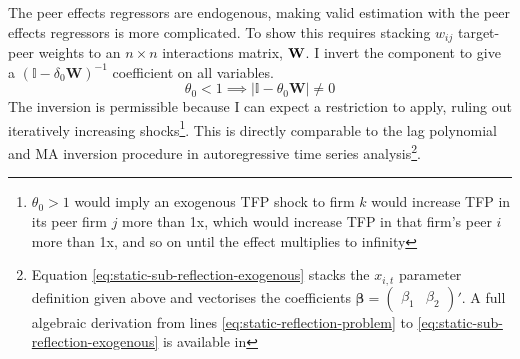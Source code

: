 The peer effects regressors are endogenous, making valid estimation with the peer effects regressors is more complicated.
To show this requires stacking $w_{ij}$ target-peer weights to an $n\times n$ interactions matrix, $\textbf W$.
I invert the  component to give a $(\mathbb I-\delta_0\mathbf W)^{-1}$ coefficient on all variables.
\begin{equation}
    \theta_0 < 1 \implies \vert \mathbb I-\theta_0 \mathbf W \vert \neq 0
\end{equation}
The inversion is permissible because I can expect a restriction to apply, ruling out iteratively increasing shocks\footnote{
    $\theta_0>1$ would imply an exogenous TFP shock to firm $k$ would
    increase TFP in its peer firm $j$ more than 1x,
    which would increase TFP in that firm's peer $i$ more than 1x,
    and so on until the effect multiplies to infinity
}. This is directly comparable to the lag polynomial and MA inversion procedure in autoregressive time series analysis\footnote{
    Equation \eqref{eq:static-sub-reflection-exogenous} stacks the $x_{i,t}$
     parameter definition given above and
    vectorises the coefficients $\boldsymbol\beta = \begin{pmatrix}\beta_1 & \beta_2\end{pmatrix}'$.
    A full algebraic derivation from lines \eqref{eq:static-reflection-problem} to \eqref{eq:static-sub-reflection-exogenous}
    is available in 
}.
